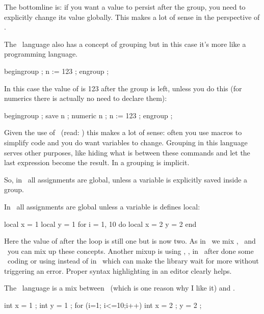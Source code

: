The bottomline is: if you want a value to persist after the group, you need to
explicitly change its value globally. This makes a lot of sense in the perspective
of \TEX.

\stopsection

\startsection[title=\METAPOST]

The \METAPOST\ language also has a concept of grouping but in this case it's more like a
programming language.

\starttyping
begingroup ;
    n := 123 ;
engroup ;
\stoptyping

In this case the value of  is 123 after the group is left, unless you do
this (for numerics there is actually no need to declare them):

\starttyping
begingroup ;
    save n ; numeric n ; n := 123 ;
engroup ;
\stoptyping

Given the use of \METAPOST\ (read: \METAFONT) this makes a lot of sense: often
you use macros to simplify code and you do want variables to change. Grouping in
this language serves other purposes, like hiding what is between these commands
and let the last expression become the result. In a  grouping is
implicit.

So, in \METAPOST\ all assignments are global, unless a variable is explicitly
saved inside a group.

\stopsection

\startsection[title=\LUA]

In \LUA\ all assignments are global unless a variable is defines local:

\starttyping
local x = 1
local y = 1
for i = 1, 10 do
    local x = 2
    y = 2
end
\stoptyping

Here the value of  after the loop is still one but  is now two.
As in \LUATEX\ we mix \TEX, \METAPOST\ and \LUA\ you can mix up these concepts.
Another mixup is using \type {:=}, ,  in \LUA\ after done
some \METAPOST\ coding or using  instead of  in
\METAPOST\ which can make the library wait for more without triggering an error.
Proper syntax highlighting in an editor clearly helps.

\stopsection

\startsection[title=\CCODE]

The \LUA\ language is a mix between \PASCAL\ (which is one reason why I like it)
and \CCODE.

\starttyping
int x = 1 ;
int y = 1 ;
for (i=1; i<=10;i++) {
    int x = 2 ;
    y = 2 ;
}
\stoptyping

